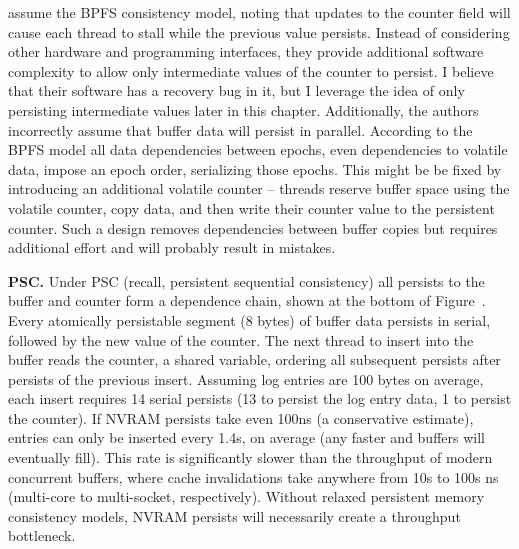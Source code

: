  assume the BPFS consistency model, noting that updates to the counter field will cause each thread to stall while the previous value persists.
Instead of considering other hardware and programming interfaces, they provide additional software complexity to allow only intermediate values of the counter to persist.
I believe that their software has a recovery bug in it, but I leverage the idea of only persisting intermediate values later in this chapter.
Additionally, the authors incorrectly assume that buffer data will persist in parallel.
According to the BPFS model all data dependencies between epochs, even dependencies to volatile data, impose an epoch order, serializing those epochs.
This might be be fixed by introducing an additional volatile counter -- threads reserve buffer space using the volatile counter, copy data, and then write their counter value to the persistent counter.
Such a design removes dependencies between buffer copies but requires additional effort and will probably result in mistakes.

\textbf{PSC.} Under PSC (recall, persistent sequential consistency) all persists to the buffer and counter form a dependence chain, shown at the bottom of Figure~.
Every atomically persistable segment (8 bytes) of buffer data persists in serial, followed by the new value of the counter.
The next thread to insert into the buffer reads the counter, a shared variable, ordering all subsequent persists after persists of the previous insert.
Assuming log entries are 100 bytes on average, each insert requires 14 serial persists (13 to persist the log entry data, 1 to persist the counter).
If NVRAM persists take even 100ns (a conservative estimate), entries can only be inserted every 1.4\textmu s, on average (any faster and buffers will eventually fill).
This rate is significantly slower than the throughput of modern concurrent buffers, where cache invalidations take anywhere from 10s to 100s ns (multi-core to multi-socket, respectively).
Without relaxed persistent memory consistency models, NVRAM persists will necessarily create a throughput bottleneck.

